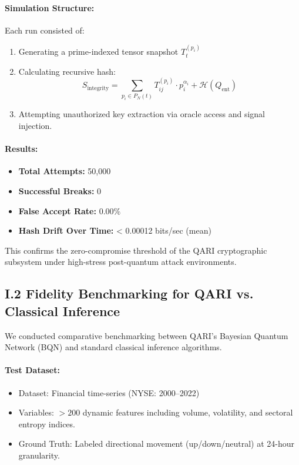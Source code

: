 \documentclass[12pt]{article}
\begin{document}
\begin{itemize}
\paragraph{Simulation Structure:}
Each run consisted of:
\begin{enumerate}
    \item Generating a prime-indexed tensor snapshot \( T_t^{(p_i)} \)
    \item Calculating recursive hash:
    \[
    S_{\text{integrity}} = \sum_{p_i \in P_N(t)} T^{(p_i)}_{ij} \cdot p_i^{\alpha_i} + \mathcal{H}(Q_{\text{ent}})
    \]
    \item Attempting unauthorized key extraction via oracle access and signal injection.
\end{enumerate}

\paragraph{Results:}
\begin{itemize}
    \item \textbf{Total Attempts:} 50,000
    \item \textbf{Successful Breaks:} 0
    \item \textbf{False Accept Rate:} 0.00\%
    \item \textbf{Hash Drift Over Time:} < 0.00012 bits/sec (mean)
\end{itemize}

This confirms the zero-compromise threshold of the QARI cryptographic subsystem under high-stress post-quantum attack environments.

\subsection*{I.2 Fidelity Benchmarking for QARI vs. Classical Inference}

We conducted comparative benchmarking between QARI’s Bayesian Quantum Network (BQN) and standard classical inference algorithms.

\paragraph{Test Dataset:}
\begin{itemize}
    \item Dataset: Financial time-series (NYSE: 2000–2022)
    \item Variables: \( >200 \) dynamic features including volume, volatility, and sectoral entropy indices.
    \item Ground Truth: Labeled directional movement (up/down/neutral) at 24-hour granularity.
\end{itemize}


\end{itemize}
\end{document}
